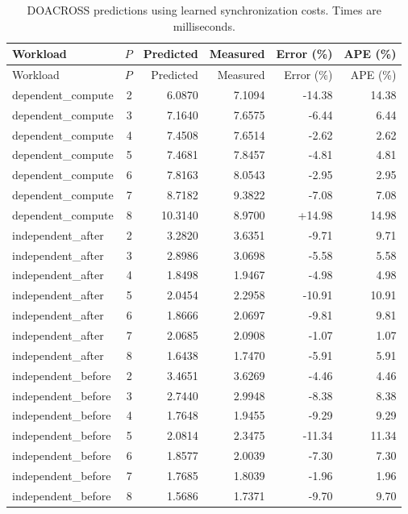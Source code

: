 \begin{center}
\small
\begin{longtable}{lrrrrr}
\caption{DOACROSS predictions using learned synchronization costs. Times are milliseconds.}\label{tab:doacross-detail}\\
\toprule
Workload & $P$ & Predicted & Measured & Error (\%) & APE (\%) \\
\midrule
\endfirsthead
\toprule
Workload & $P$ & Predicted & Measured & Error (\%) & APE (\%) \\
\midrule
\endhead
\bottomrule\endfoot
dependent\_compute & 2 & 6.0870 & 7.1094 & -14.38 & 14.38 \\
dependent\_compute & 3 & 7.1640 & 7.6575 & -6.44 & 6.44 \\
dependent\_compute & 4 & 7.4508 & 7.6514 & -2.62 & 2.62 \\
dependent\_compute & 5 & 7.4681 & 7.8457 & -4.81 & 4.81 \\
dependent\_compute & 6 & 7.8163 & 8.0543 & -2.95 & 2.95 \\
dependent\_compute & 7 & 8.7182 & 9.3822 & -7.08 & 7.08 \\
dependent\_compute & 8 & 10.3140 & 8.9700 & +14.98 & 14.98 \\
independent\_after & 2 & 3.2820 & 3.6351 & -9.71 & 9.71 \\
independent\_after & 3 & 2.8986 & 3.0698 & -5.58 & 5.58 \\
independent\_after & 4 & 1.8498 & 1.9467 & -4.98 & 4.98 \\
independent\_after & 5 & 2.0454 & 2.2958 & -10.91 & 10.91 \\
independent\_after & 6 & 1.8666 & 2.0697 & -9.81 & 9.81 \\
independent\_after & 7 & 2.0685 & 2.0908 & -1.07 & 1.07 \\
independent\_after & 8 & 1.6438 & 1.7470 & -5.91 & 5.91 \\
independent\_before & 2 & 3.4651 & 3.6269 & -4.46 & 4.46 \\
independent\_before & 3 & 2.7440 & 2.9948 & -8.38 & 8.38 \\
independent\_before & 4 & 1.7648 & 1.9455 & -9.29 & 9.29 \\
independent\_before & 5 & 2.0814 & 2.3475 & -11.34 & 11.34 \\
independent\_before & 6 & 1.8577 & 2.0039 & -7.30 & 7.30 \\
independent\_before & 7 & 1.7685 & 1.8039 & -1.96 & 1.96 \\
independent\_before & 8 & 1.5686 & 1.7371 & -9.70 & 9.70 \\

\end{longtable}
\end{center}
